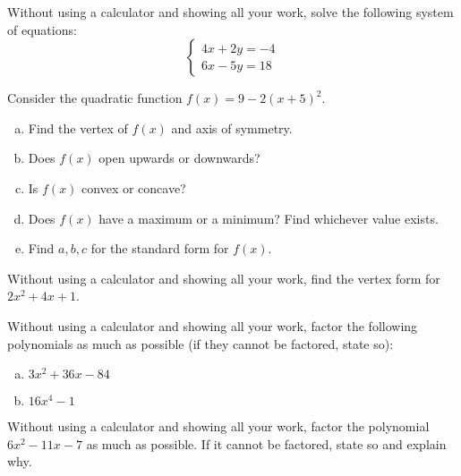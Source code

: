 \documentclass[12pt,letterpaper]{exam}
\begin{document}
\examtitle
{} 
\scores
\bottomline
\newpage

\begin{questions}

\newpage
\question[10] Without using a calculator and showing all your work, solve the following system of equations:
	\[
	\begin{cases}
	4x + 2y= -4 \\
	6x - 5y= 18
	\end{cases}
	\]



\newpage
\question[10] Consider the quadratic function $f(x)= 9 - 2(x + 5)^2$.
	\begin{enumerate}[(a)]
	\item Find the vertex of $f(x)$ and axis of symmetry. 
	\item Does $f(x)$ open upwards or downwards?
	\item Is $f(x)$ convex or concave?
	\item Does $f(x)$ have a maximum or a minimum? Find whichever value exists. 
	\item Find $a, b, c$ for the standard form for $f(x)$. 
	\end{enumerate}



\newpage
\question[10] Without using a calculator and showing all your work, find the vertex form for $2x^2 + 4x + 1$. 



\newpage
\question[10] Without using a calculator and showing all your work, factor the following polynomials as much as possible (if they cannot be factored, state so):
	\begin{enumerate}[(a)]
	\item $3x^2 + 36x - 84$
	\item $16x^4 - 1$
	\end{enumerate}



\newpage
\question[10] Without using a calculator and showing all your work, factor the polynomial $6x^2 - 11x - 7$ as much as possible. If it cannot be factored, state so and explain why. 




\end{questions}
\end{document}
